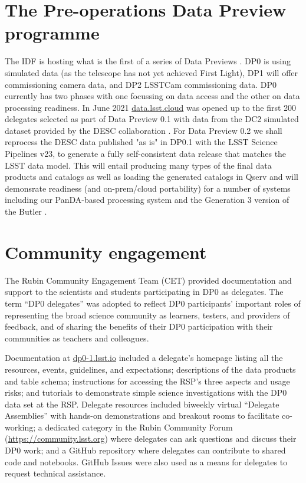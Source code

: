 \documentclass[11pt,twoside]{article}
\begin{document}
\section {The Pre-operations Data Preview programme}
The IDF is hosting what is the first of a series of Data Previews \citep[DP;][]{RDO-011}. DP0 is using simulated data (as the telescope has not yet achieved First Light), DP1 will offer commissioning camera data,
and DP2 LSSTCam commissioning data. DP0 currently has two phases\citep{RTN-001} with one focussing on data access and the other on data processing readiness.
In June 2021 \href{https://data.lsst.cloud}{data.lsst.cloud} was opened up to the first 200 delegates selected as part of Data Preview 0.1 with data from the DC2 simulated dataset provided by the DESC collaboration \citep{arXiv:2010.05926}.
For Data Preview 0.2 we shall reprocess the DESC data published "as is" in DP0.1 with the LSST Science Pipelines v23, to generate a fully self-consistent data release that matches the LSST data model.
This will entail producing many types of the final data products and catalogs as well as loading the  generated catalogs in Qserv and will demonsrate readiness (and on-prem/cloud portability) for a number of systems including our PanDA-based processing system and the Generation 3 version of the Butler \citep{2019ASPC..523..653J}.

\section{Community engagement }
The Rubin Community Engagement Team (CET) provided documentation and support to the scientists and students participating in DP0 as delegates.
The term ``DP0 delegates'' was adopted to reflect DP0 participants’ important roles of representing the broad science community as learners, testers, and providers of feedback, and of sharing the benefits of their DP0 participation with their communities as teachers and colleagues.

Documentation at \href{https://dp0-1.lsst.io}{dp0-1.lsst.io} included a delegate's homepage listing all the resources, events, guidelines, and expectations; descriptions of the data products and table schema; instructions for accessing the RSP's three aspects and usage risks; and tutorials to demonstrate simple science investigations with the DP0 data set at the RSP.
Delegate resources included biweekly virtual ``Delegate Assemblies'' with hands-on demonstrations and breakout rooms to facilitate co-working; a dedicated category in the Rubin Community Forum (\url{https://community.lsst.org}) where delegates can ask questions and discuss their DP0 work; and a GitHub repository where delegates can contribute to shared code and notebooks.
GitHub Issues were also used as a means for delegates to request technical assistance.
\end{document}
